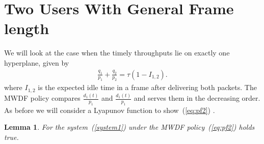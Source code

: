 \documentclass[letterpaper, 10 pt, conference]{ieeeconf}
\newtheorem{lemma}{Lemma}
\begin{document}
 \section{Two Users With General Frame length}\label{sec4}
We will look at the case when the timely throughputs lie on exactly one hyperplane, given by
\begin{align}\label{system1}
\frac{q_{1}}{p_{1}} +\frac{q_{2}}{p_{2}} = \tau(1-I_{1,2}).
\end{align}
where $I_{1,2}$ is the expected idle time in a frame after delivering both packets.
The MWDF policy compares $\frac{d_{1} (t)}{p_{1}}$ and $\frac{d_{1} (t)}{p_{1}}$ and serves them in the decreasing order. As before we will consider a Lyapunov function to show~(\ref{eq:pf2}) .
\begin{lemma}\label{lemma8}
For the system~(\ref{system1}) under the MWDF policy~(\ref{eq:pf2}) holds true.
\end{lemma}
\end{document}
